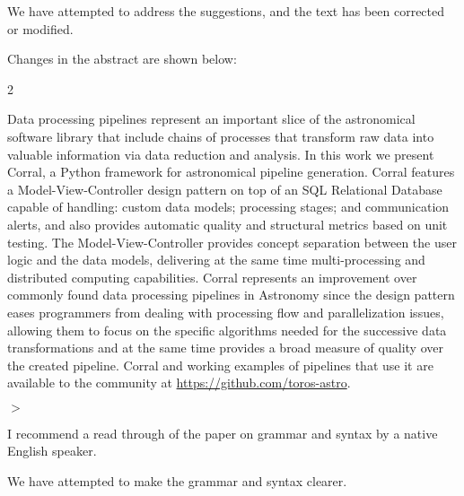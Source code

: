 \documentclass[a4paper,onecolumn,fleqn,usenatbib,useAMS]{mnrasr}
\newenvironment{frshaded}{%
\def\FrameCommand{\fboxrule=\FrameRule\fboxsep=\FrameSep \fcolorbox{framecolor}{shadecolor}}%
\MakeFramed {\FrameRestore}}%
{\endMakeFramed}
\newenvironment{myindentpar}[1]%
 {\begin{list}{}%
         \bigskip
         \color{refereecolor}
         {\setlength{\leftmargin}{#1}}%
         \itshape
         \item[$>$]%
 }
 {\end{list}}
\begin{document}
%
We have attempted to address the suggestions, and the text has been 
corrected or modified.

Changes in the abstract are shown below:

\begin{frshaded}
\begin{multicols}{2} 
   
Data processing pipelines represent an important slice of the astronomical software
library that include chains of processes that transform raw data into valuable 
information via data reduction and analysis.
%
In this work we present Corral, a Python framework for astronomical pipeline generation.
Corral features a Model-View-Controller design pattern on top of an SQL Relational Database
capable of handling: custom data models; processing stages; and communication alerts,
and also provides automatic quality and structural metrics based on unit testing.
%
The Model-View-Controller provides concept separation between the user logic and
the data models, delivering at the same time multi-processing
and distributed computing capabilities.
%
Corral represents an improvement over commonly found data processing
pipelines in Astronomy since the design pattern eases programmers from dealing 
with processing flow and parallelization issues,
allowing them to focus on the specific algorithms needed for the successive 
data transformations and at the same time provides a broad measure of quality over the created pipeline.
%
Corral and working examples of pipelines that use it are available to the community
at \url{https://github.com/toros-astro}.

\end{multicols} 
\end{frshaded} 

\begin{myindentpar}{1cm}

I recommend a read through of the paper on grammar and syntax by a
native English speaker. 
 
\end{myindentpar}

%
We have attempted to make the grammar and syntax clearer. 


\renewcommand{\refname}{\normalfont\selectfont\normalsize\underline{References}}


\end{document}
